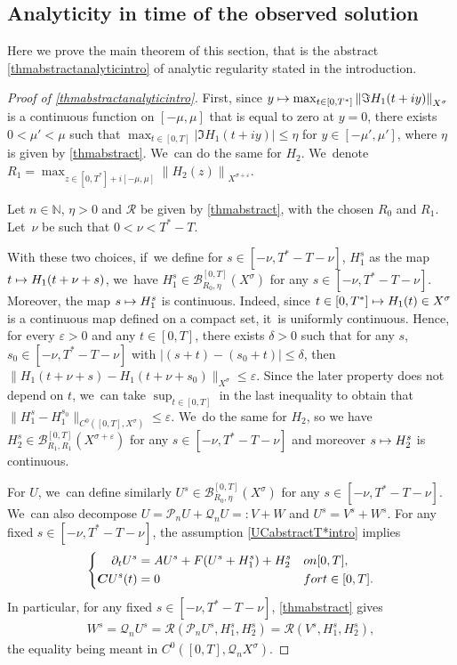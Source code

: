 \documentclass[11pt]{article}
\newcommand\mto{\mathchoice{\longmapsto}{\mapsto}{\mapsto}{\mapsto}}
\theoremstyle{definition}
\let\mc\mathcal
\let\veps\varepsilon
\newcommand{\B}{\mc{B}}
\newcommand{\N}{\mathbb{N}}
\newcommand{\Q}{\mathcal{Q}}
\renewcommand{\P}{\mathcal{P}}
\newcommand{\bC}{\boldsymbol{C}}
\providecommand{\norm}[1]{\lVert#1\rVert}
\newcommand\nor[2]{\left\|#1\right\|_{#2}}
\begin{document}
\subsection{Analyticity in time of the observed solution} Here we prove the main theorem of this section, that is the abstract \cref{thmabstractanalyticintro} of analytic regularity stated in the introduction.
\begin{proof}[Proof of \cref{thmabstractanalyticintro}]
First, since $y\mto \max_{t\in [0,T^{*}]}\nor{\Im H_{1}(t+iy)}{X^{\sigma}}$ is a continuous function on $[-\mu,\mu]$ that is equal to zero at $y=0$, there exists $0<\mu'<\mu$ such that $\max_{t\in [0,T]}\left|\Im H_{1}(t+iy)\right| \leq \eta$ for $y\in [-\mu',\mu']$, where $\eta$ is given by \cref{thmabstract}. We~can do the same for $H_{2}$. We~denote $R_{1}=\max_{z\in [0,T^{*}]+i[-\mu,\mu]}\nor{H_{2}(z)}{X^{\sigma+\veps}}$.

Let $n\in \N$, $\eta>0$ and $\mathcal{R}$ be given by \cref{thmabstract}, with the chosen $R_0$ and $R_{1}$. Let~$\nu$ be such that $0<\nu<T^*-T$.

With these two choices, if~we define for $s\in [-\nu, T^*-T-\nu]$, $H_{1}^{s}$ as the map $t\mto H_{1}(t+\nu+s)$, we~have $H_{1}^{s} \in \B_{R_{0},\eta}^{[0,T]}(X^{\sigma})$ for any $s\in [-\nu, T^*-T-\nu]$. Moreover, the map $s\mto H_1^s$ is continuous. Indeed, since $t\in [0, T^*]\mto H_1(t)\in X^\sigma$ is a continuous map defined on a compact set, it~is uniformly continuous. Hence, for every $\veps>0$ and any $t\in [0, T]$, there exists $\delta>0$ such that for any $s$, $s_0\in [-\nu, T^*-T-\nu]$ with $|(s+t)-(s_0+t)|\leq \delta$, then $\norm{H_1(t+\nu+s)-H_1(t+\nu+s_0)}_{X^\sigma}\leq \veps$. Since the later property does not depend on $t$, we~can take $\sup_{t\in [0, T]}$ in the last inequality to obtain that $\norm{H_1^s-H_1^{s_0}}_{C^0([0, T], X^\sigma)}\leq \veps$. We~do the same for $H_2$, so we have $H_2^s\in \B_{R_{1},R_{1}}^{[0,T]}(X^{\sigma+\veps})$ for any $s\in [-\nu, T^*-T-\nu]$ and moreover $s\mto H_2^s$ is continuous.

For $U$, we~can define similarly $U^s\in \B_{R_{0},\eta}^{[0,T]}(X^{\sigma})$ for any $s\in [-\nu, T^*-T-\nu]$. We~can also decompose $U=\P_n U+\Q_n U=:V+W$ and $U^s=V^s+W^s$. For any fixed $s\in [-\nu, T^*-T-\nu]$, the assumption \eqref{UCabstractT*intro} implies
\begin{align}\label{UCabstractwiths}
\left\{\begin{aligned}
\partial_t U^s&=AU^s+F(U^s+H_{1}^s)+H_{2}^s&& \textnormal{on } [0,T],\\
\bC U^s(t)&=0 &&\textnormal{for }t\in [0,T].
\end{aligned}\right.
\end{align}
In particular, for any fixed $s\in [-\nu, T^*-T-\nu]$, \cref{thmabstract} gives
\begin{align}
\label{equalWs}
W^s=\Q_n U^s=\mathcal{R}(\P_{n}U^s,H_{1}^s,H_{2}^s)=\mathcal{R}(V^s,H_{1}^s,H_{2}^s),
\end{align} the equality being meant in $C^0([0,T], \Q_n X^{\sigma})$.


\end{proof}
\end{document}
